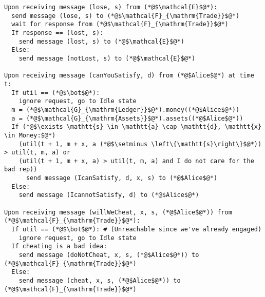 \begin{lstlisting}[label=satprot, style=numbers]
Upon receiving message (lose, s) from (*@$\mathcal{E}$@*):
  send message (lose, s) to (*@$\mathcal{F}_{\mathrm{Trade}}$@*)
  wait for response from (*@$\mathcal{F}_{\mathrm{Trade}}$@*)
  If response == (lost, s):
    send message (lost, s) to (*@$\mathcal{E}$@*)
  Else:
    send message (notLost, s) to (*@$\mathcal{E}$@*)

Upon receiving message (canYouSatisfy, d) from (*@$Alice$@*) at time t:
  If util == (*@$\bot$@*):
    ignore request, go to Idle state
  m = (*@$\mathcal{G}_{\mathrm{Ledger}}$@*).money((*@$Alice$@*))
  a = (*@$\mathcal{G}_{\mathrm{Assets}}$@*).assets((*@$Alice$@*))
  If (*@$\exists \mathtt{s} \in \mathtt{a} \cap \mathtt{d}, \mathtt{x} \in Money:$@*)
    (util(t + 1, m + x, a (*@$\setminus \left\{\mathtt{s}\right\}$@*)) > util(t, m, a) or
    (util(t + 1, m + x, a) > util(t, m, a) and I do not care for the bad rep))
      send message (IcanSatisfy, d, x, s) to (*@$Alice$@*)
  Else:
    send message (IcannotSatisfy, d) to (*@$Alice$@*)

Upon receiving message (willWeCheat, x, s, (*@$Alice$@*)) from (*@$\mathcal{F}_{\mathrm{Trade}}$@*):
  If util == (*@$\bot$@*): # (Unreachable since we've already engaged)
    ignore request, go to Idle state
  If cheating is a bad idea:
    send message (doNotCheat, x, s, (*@$Alice$@*)) to (*@$\mathcal{F}_{\mathrm{Trade}}$@*)
  Else:
    send message (cheat, x, s, (*@$Alice$@*)) to (*@$\mathcal{F}_{\mathrm{Trade}}$@*)
\end{lstlisting}
